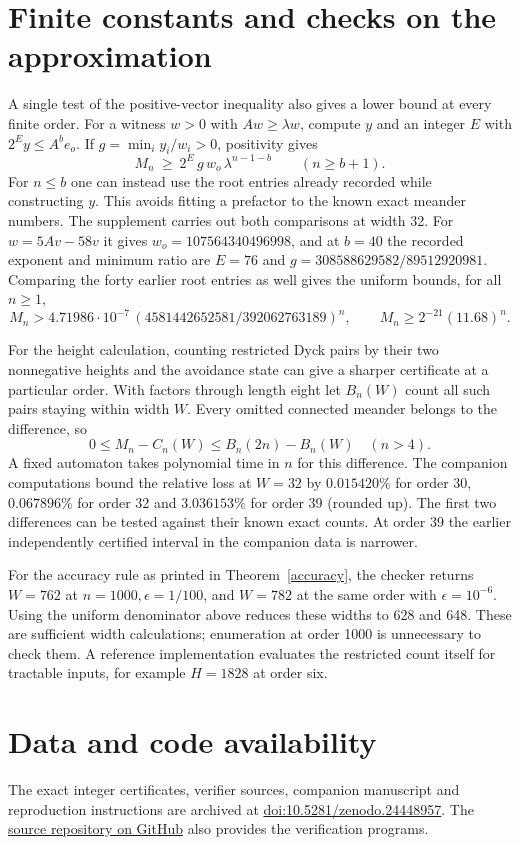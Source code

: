 \documentclass[11pt]{article}
\newcommand{\wnum}{4581442652581}
\newcommand{\wden}{392062763189}
\begin{document}
\newpage
\section{Finite constants and checks on the approximation}
A single test of the positive-vector inequality also gives a lower bound at every finite order. For a witness \(w>0\) with \(Aw\ge\lambda w\), compute \(y\) and an integer \(E\) with \(2^E y\le A^b e_o\). If \(g=\min_i y_i/w_i>0\), positivity gives
\[
  M_n\ \ge\ 2^E\,g\,w_o\,\lambda^{n-1-b}\qquad(n\ge b+1).
\]
For \(n\le b\) one can instead use the root entries already recorded while constructing \(y\). This avoids fitting a prefactor to the known exact meander numbers. The supplement carries out both comparisons at width 32. For \(w=5Av-58v\) it gives \(w_o=107564340496998\), and at \(b=40\) the recorded exponent and minimum ratio are \(E=76\) and \(g=308588629582/89512920981\). Comparing the forty earlier root entries as well gives the uniform bounds, for all \(n\ge1\),
\[
 M_n>4.71986\cdot 10^{-7}\,(\wnum/\wden)^n,\qquad
 M_n\ge 2^{-21}(11.68)^n.
\]

For the height calculation, counting restricted Dyck pairs by their two nonnegative heights and the avoidance state can give a sharper certificate at a particular order. With factors through length eight let \(B_n(W)\) count all such pairs staying within width \(W\). Every omitted connected meander belongs to the difference, so
\[
 0\le M_n-C_n(W)\le B_n(2n)-B_n(W)\quad(n>4).
\]
A fixed automaton takes polynomial time in \(n\) for this difference. The companion computations bound the relative loss at \(W=32\) by \(0.015420\%\) for order 30, \(0.067896\%\) for order 32 and \(3.036153\%\) for order 39 (rounded up). The first two differences can be tested against their known exact counts. At order 39 the earlier independently certified interval in the companion data is narrower.

For the accuracy rule as printed in Theorem~\ref{accuracy}, the checker returns \(W=762\) at \(n=1000,\epsilon=1/100\), and \(W=782\) at the same order with \(\epsilon=10^{-6}\). Using the uniform denominator above reduces these widths to 628 and 648. These are sufficient width calculations; enumeration at order 1000 is unnecessary to check them. A reference implementation evaluates the restricted count itself for tractable inputs, for example \(H=1828\) at order six.

\newpage
\section*{Data and code availability}
The exact integer certificates, verifier sources, companion manuscript and reproduction instructions are archived at
\href{https://doi.org/10.5281/zenodo.24448957}{doi:10.5281/zenodo.24448957}.
The \href{https://github.com/Kimargin8/meander-growth-bound}{source repository on GitHub} also provides the verification programs.
\end{document}
